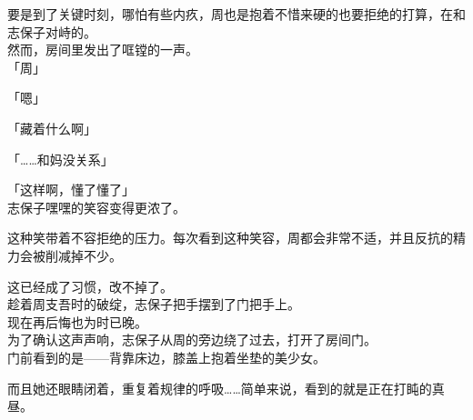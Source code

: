 要是到了关键时刻，哪怕有些内疚，周也是抱着不惜来硬的也要拒绝的打算，在和志保子对峙的。\\

然而，房间里发出了哐镗的一声。\\

「周」

「嗯」

「藏着什么啊」

「……和妈没关系」

「这样啊，懂了懂了」\\

志保子嘿嘿的笑容变得更浓了。

这种笑带着不容拒绝的压力。每次看到这种笑容，周都会非常不适，并且反抗的精力会被削减掉不少。

这已经成了习惯，改不掉了。\\

趁着周支吾时的破绽，志保子把手摆到了门把手上。\\

现在再后悔也为时已晚。\\

为了确认这声声响，志保子从周的旁边绕了过去，打开了房间门。\\

门前看到的是——背靠床边，膝盖上抱着坐垫的美少女。

而且她还眼睛闭着，重复着规律的呼吸……简单来说，看到的就是正在打盹的真昼。
